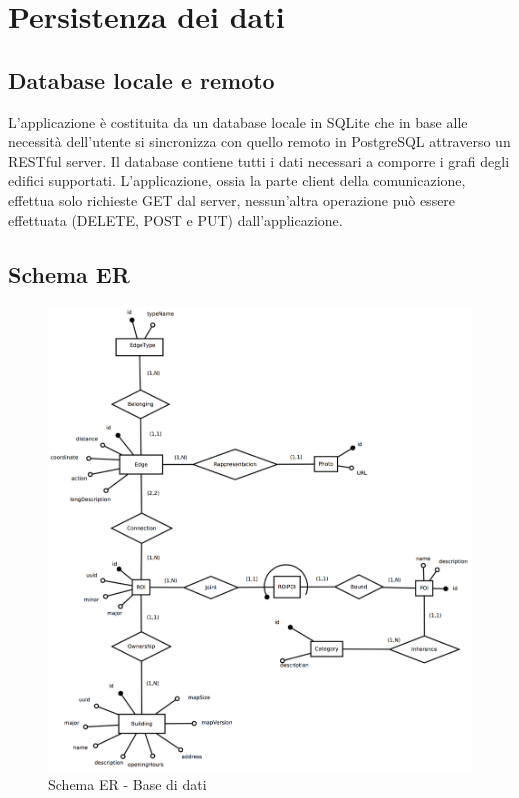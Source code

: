 \documentclass[../ManualeSviluppatore.tex]{subfiles}
\begin{document}
\section{Persistenza dei dati}
\label{sec:PersistenzaDeiDati}

	\subsection{Database locale e remoto}
		L'applicazione è costituita da un database locale in SQLite che in base alle necessità dell'utente si sincronizza con quello remoto in PostgreSQL attraverso un RESTful server. Il database contiene tutti i dati necessari a comporre i grafi degli edifici supportati. L'applicazione, ossia la parte client della comunicazione, effettua solo richieste GET dal server, nessun'altra operazione può essere effettuata (DELETE, POST e PUT) dall'applicazione. 
	
		\subsection{Schema ER}
		\begin{figure} [h]
				\includegraphics[scale=0.5]{img/db}		
				\caption{Schema ER - Base di dati}
				\label{Database}
		\end{figure}
\end{document}
